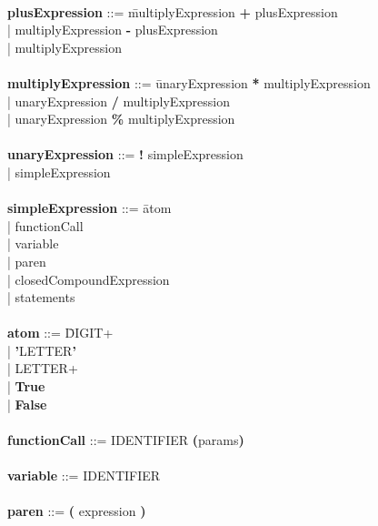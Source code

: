 \begin{tabbing}
            \\ 
            {\bf plusExpression}              ::= \=multiplyExpression \textbf{+} plusExpression\\
                                                  \>| multiplyExpression \textbf{-} plusExpression\\
                                                  \>| multiplyExpression\\
            \\
            {\bf multiplyExpression}          ::= \=unaryExpression \textbf{*} multiplyExpression\\
                                                  \>| unaryExpression \textbf{/} multiplyExpression\\
                                                  \>| unaryExpression \textbf{\%} multiplyExpression\\
            \\
            {\bf unaryExpression}             ::= \=\textbf{!} simpleExpression\\
                                                  \>| simpleExpression\\ 
            \\   
            {\bf simpleExpression}            ::= \=atom\\
                                                  \>| functionCall\\
                                                  \>| variable\\
                                                  \>| paren\\
                                                  \>| closedCompoundExpression\\
                                                  \>| statements\\
            \\
            {\bf atom}                        ::= \=DIGIT+\\
                                                  \>| \textbf{'}LETTER\textbf{'}\\
                                                  \>| LETTER+\\
                                                  \>| \textbf{True}\\
                                                  \>| \textbf{False}\\
            \\   
            {\bf functionCall}                ::= IDENTIFIER \textbf{(}params\textbf{)} \\
            \\      
            {\bf variable}                    ::= IDENTIFIER \\
            \\ 
            {\bf paren}                       ::= \textbf{(} expression \textbf{)}\\
        \end{tabbing}
